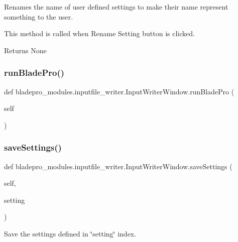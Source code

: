 Renames the name of user defined settings to make their name represent something to the user. 

This method is called when Rename Setting button is clicked.

\begin{DoxyReturn}{Returns}
None 
\end{DoxyReturn}
\hypertarget{a00070_a4f95b1c85e601bde79e5d4e1a526ef8b}{}\label{a00070_a4f95b1c85e601bde79e5d4e1a526ef8b} 
\subsubsection{\texorpdfstring{run\+Blade\+Pro()}{runBladePro()}}
{\footnotesize\ttfamily def bladepro\+\_\+modules.\+inputfile\+\_\+writer.\+Input\+Writer\+Window.\+run\+Blade\+Pro (\begin{DoxyParamCaption}\item[{}]{self }\end{DoxyParamCaption})}

\hypertarget{a00070_a723573fade09f206a9c89569885558c1}{}\label{a00070_a723573fade09f206a9c89569885558c1} 
\subsubsection{\texorpdfstring{save\+Settings()}{saveSettings()}}
{\footnotesize\ttfamily def bladepro\+\_\+modules.\+inputfile\+\_\+writer.\+Input\+Writer\+Window.\+save\+Settings (\begin{DoxyParamCaption}\item[{}]{self,  }\item[{}]{setting }\end{DoxyParamCaption})}



Save the settings defined in \char`\"{}setting\char`\"{} index. 

